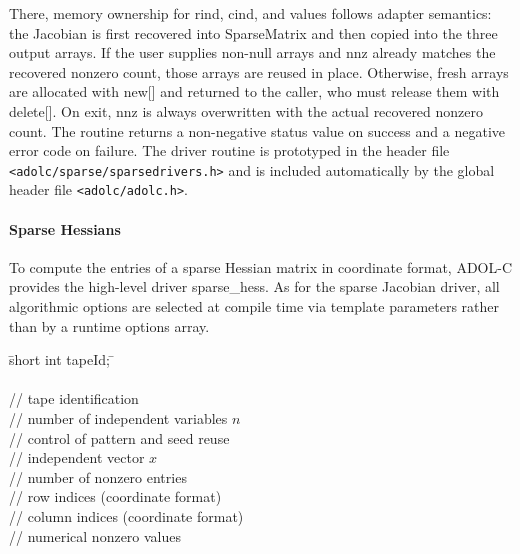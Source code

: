 \documentclass[11pt,twoside]{article}
\begin{document}
There, memory ownership for {\sf rind}, {\sf cind}, and {\sf values} follows
adapter semantics: the Jacobian is first recovered into {\sf SparseMatrix}
and then copied into the three output arrays. If the user supplies non-null
arrays and {\sf *nnz} already matches the recovered nonzero count, those arrays
are reused in place. Otherwise, fresh arrays are allocated with {\sf new[]}
and returned to the caller, who must release them with {\sf delete[]}. On
exit, {\sf *nnz} is always overwritten with the actual recovered nonzero count.
%
The routine returns a non-negative status value on success and a
negative error code on failure.
%
The driver routine is prototyped in the header file
\verb=<adolc/sparse/sparsedrivers.h>= and is included automatically by
the global header file \verb=<adolc/adolc.h>=.

         
\paragraph{Sparse Hessians}
%
To compute the entries of a sparse Hessian matrix in coordinate format,
ADOL-C provides the high-level driver {\sf sparse\_hess}.
%
As for the sparse Jacobian driver, all algorithmic options are selected
at compile time via template parameters rather than by a runtime
{\sf options} array.
%
\begin{tabbing}
\hspace{0.5in}\={\sf short int tapeId;} \hspace{1.2in}\= \kill
{}\\
\\
          \> // tape identification \\
                 \> // number of independent variables $n$ \\
                \> // control of pattern and seed reuse \\
   \> // independent vector $x$ \\
                  \> // number of nonzero entries \\
       \> // row indices (coordinate format) \\
       \> // column indices (coordinate format) \\
           \> // numerical nonzero values \\
\end{tabbing}
\end{document}
